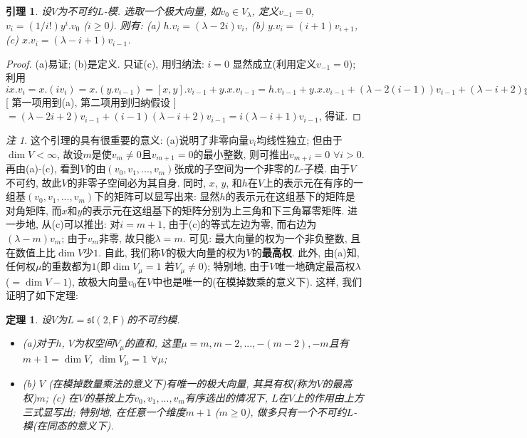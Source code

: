 \documentclass{ctexart}%
\newtheorem{theorem}{定理}
\newtheorem{lemma}{引理}
\theoremstyle{definition}
\theoremstyle{remark}
\newtheorem{remark}{注}
\begin{document}
\begin{lemma}\label{7.2l}
设$V$为不可约$L$-模. 选取一个极大向量, 如$v_0\in V_\lambda$, 定义$v_{-1}=0$, $v_i= (1/i!) y^i.v_0$ ($i\geq 0$). 则有: (a) $h.v_i = (\lambda-2i)v_i$, (b) $y.v_i = (i+1) v_{i+1}$, (c) $x.v_i = (\lambda-i+1)v_{i-1}$.
\end{lemma}
\begin{proof}
(a)易证; (b)是定义. 只证(c), 用归纳法: $i=0$ 显然成立(利用定义$v_{-1}=0$); 利用 $ix.v_i = x.(i v_i)=x.(y.v_{i-1}) = [x,y].v_{i-1} + y.x.v_{i-1} = h.v_{i-1}+y.x.v_{i-1} + (\lambda-2(i-1))v_{i-1} + (\lambda-i+2)y.v_{i-2}$ [ 第一项用到(a), 第二项用到归纳假设 ] $=(\lambda-2i+2)v_{i-1} +(i-1)(\lambda-i+2) v_{i-1} = i(\lambda-i+1)v_{i-1}$, 得证.
\end{proof}
\begin{remark}
这个引理的具有很重要的意义: (a)说明了非零向量$v_i$均线性独立; 但由于$\dim V <\infty$,  故设$m$是使$v_m\neq 0$且$v_{m+1}=0$的最小整数, 则可推出$v_{m+i}=0$ $\forall i>0$. 再由(a)-(c), 看到$V$的由$(v_0,v_1,...,v_m)$张成的子空间为一个非零的$L$-子模. 由于$V$不可约, 故此$V$的非零子空间必为其自身. 同时, $x$, $y$, 和$h$在$V$上的表示元在有序的一组基$(v_0,v_1,...,v_m)$下的矩阵可以显写出来: 显然$h$的表示元在这组基下的矩阵是对角矩阵, 而$x$和$y$的表示元在这组基下的矩阵分别为上三角和下三角幂零矩阵. 进一步地, 从(c)可以推出: 对$i=m+1$, 由于(c)的等式左边为零, 而右边为$(\lambda-m)v_m$; 由于$v_m$非零, 故只能$\lambda=m$. 可见: 最大向量的权为一个非负整数, 且在数值上比$\dim V$少$1$. 自此, 我们称$V$的极大向量的权为$V$的\textbf{最高权}. 此外, 由(a)知, 任何权$\mu$的重数都为$1$(即$\dim V_\mu = 1$ 若$V_\mu\neq 0$); 特别地, 由于$V$唯一地确定最高权$\lambda$($=\dim V-1$), 故极大向量$v_0$在$V$中也是唯一的(在模掉数乘的意义下). 这样, 我们证明了如下定理:
\end{remark}
\begin{theorem}\label{7.2}
设$V$为$L=\mathfrak{sl}(2,\mathsf{F})$的不可约模. 
\begin{itemize}
\item (a)对于$h$, $V$为权空间$V_\mu$的直和, 这里$\mu=m,m-2,...,-(m-2), -m$且有$m+1 = \dim V$, $\dim V_\mu=1$ $\forall \mu$;
\item (b) $V$ (在模掉数量乘法的意义下)有唯一的极大向量, 其具有权(称为$V$的最高权)$m$;
(c) 在$V$的基按上方$v_0,v_1,...,v_m$有序选出的情况下, $L$在$V$上的作用由上方三式显写出; 特别地, 在任意一个维度$m+1$ ($m\geq 0$), 做多只有一个不可约$L$-模(在同态的意义下).
\end{itemize}
\end{theorem}
\end{document}
